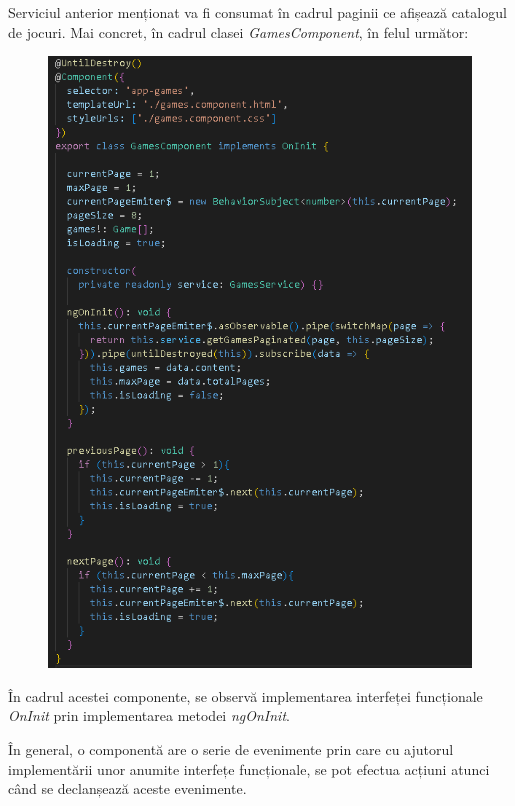 \documentclass[12pt,a4paper]{report}
\begin{document}
Serviciul anterior menționat va fi consumat în cadrul paginii ce afișează catalogul de jocuri. Mai concret, în cadrul clasei \emph{GamesComponent}, în felul următor:

\begin{figure}[H]
\centering
\caption{}
\begin{adjustbox}{max size={\textwidth}{\textheight}}
\includegraphics{exemplu_33_subscribe}
\end{adjustbox}

\caption*{}
\end{figure}

În cadrul acestei componente, se observă implementarea interfeței funcționale \emph{OnInit} prin implementarea metodei \emph{ngOnInit}. 

În general, o componentă are o serie de evenimente prin care cu ajutorul implementării unor anumite interfețe funcționale, se pot efectua acțiuni atunci când se declanșează aceste evenimente.  \cite{34}
\end{document}
